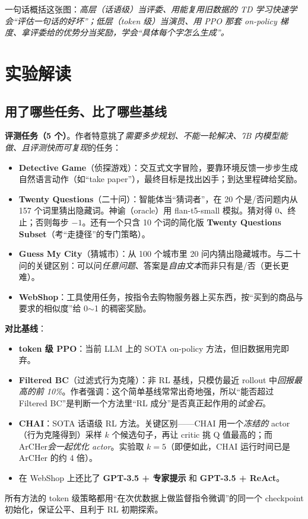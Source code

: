 \documentclass[11pt,UTF8,fontset=fandol]{ctexart}
\begin{document}
一句话概括这张图：\emph{高层（话语级）当评委、用能复用旧数据的 TD 学习快速学会“评估一句话的好坏”；低层（token 级）当演员、用 PPO 那套 on-policy 梯度、拿评委给的优势分当奖励，学会“具体每个字怎么生成”。}

\section{实验解读}

\subsection{用了哪些任务、比了哪些基线}

\textbf{评测任务（5 个）}。作者特意挑了\emph{需要多步规划、不能一轮解决、7B 内模型能做、且评测快而可复现}的任务：
\begin{itemize}[leftmargin=1.5em]
\item \textbf{Detective Game}（侦探游戏）：交互式文字冒险，要靠环境反馈一步步生成自然语言动作（如“take paper”），最终目标是找出凶手；到达里程碑给奖励。
\item \textbf{Twenty Questions}（二十问）：智能体当“猜词者”，在 20 个是/否问题内从 157 个词里猜出隐藏词。神谕（oracle）用 flan-t5-small 模拟。猜对得 0、终止；否则每步 $-1$。还有一个只含 10 个词的简化版 \textbf{Twenty Questions Subset}（考“走捷径”的专门策略）。
\item \textbf{Guess My City}（猜城市）：从 100 个城市里 20 问内猜出隐藏城市。与二十问的关键区别：可以问\emph{任意问题}、答案是\emph{自由文本}而非只有是/否（更长更难）。
\item \textbf{WebShop}：工具使用任务，按指令去购物服务器上买东西，按“买到的商品与要求的相似度”给 0$\sim$1 的稠密奖励。
\end{itemize}

\textbf{对比基线}：
\begin{itemize}[leftmargin=1.5em]
\item \textbf{token 级 PPO}：当前 LLM 上的 SOTA on-policy 方法，但旧数据用完即弃。
\item \textbf{Filtered BC}（过滤式行为克隆）：非 RL 基线，只模仿最近 rollout 中\emph{回报最高的前 10\%}。作者强调：这个简单基线常常出奇地强，所以“能否超过 Filtered BC”是判断一个方法里“RL 成分”是否真正起作用的\emph{试金石}。
\item \textbf{CHAI}：SOTA 话语级 RL 方法。关键区别——CHAI 用一个\emph{冻结的} actor（行为克隆得到）采样 $k$ 个候选句子，再让 critic 挑 Q 值最高的；而 ArCHer\emph{会一起优化 actor}。实验取 $k=5$（即便如此，CHAI 运行时间已是 ArCHer 的约 4 倍）。
\item 在 WebShop 上还比了 \textbf{GPT-3.5 + 专家提示} 和 \textbf{GPT-3.5 + ReAct}。
\end{itemize}
所有方法的 token 级策略都用“在次优数据上做监督指令微调”的同一个 checkpoint 初始化，保证公平、且利于 RL 初期探索。
\end{document}
